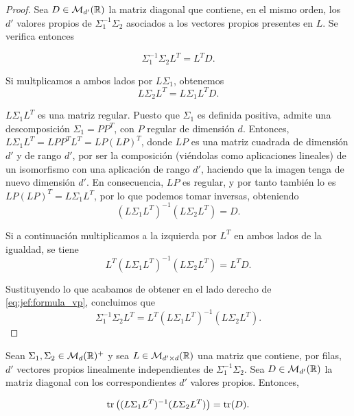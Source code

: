 \documentclass{book}
\begin{document}
\begin{proof} \label{thm:dmlmj1}
	Sea $D \in \mathcal{M}_{d'}(\mathbb{R})$ la matriz diagonal que contiene, en el mismo orden, los $d'$ valores propios de $\Sigma_1^{-1}\Sigma_2$ asociados a los vectores propios presentes en $L$. Se verifica entonces
	
	\begin{equation}\label{eq:jef:formula_vp}
		\Sigma_1^{-1}\Sigma_2L^T = L^TD.
	\end{equation} 

	Si multplicamos a ambos lados por $L\Sigma_1$, obtenemos
	\[ L\Sigma_2L^T = L\Sigma_1L^TD. \]

	$L\Sigma_1L^T$ es una matriz regular. Puesto que $\Sigma_1$ es definida positiva, admite una descomposición $\Sigma_1 = PP^T$, con $P$ regular de dimensión $d$. Entonces, $L\Sigma_1L^T = LPP^TL^T = LP(LP)^T$, donde $LP$ es una matriz cuadrada de dimensión $d'$ y de rango $d'$, por ser la composición (viéndolas como aplicaciones lineales) de un isomorfismo con una aplicación de rango $d'$, haciendo que la imagen tenga de nuevo dimensión $d'$. En consecuencia, $LP$ es regular, y por tanto también lo es $LP(LP)^T = L\Sigma_1L^T$, por lo que podemos tomar inversas, obteniendo
	\begin{equation} \label{eq:jef:coro1_pre}
		(L\Sigma_1L^T)^{-1}(L\Sigma_2L^T) = D.
	\end{equation}

	Si a continuación multiplicamos a la izquierda por $L^T$ en ambos lados de la igualdad, se tiene
	\[ L^T(L\Sigma_1L^T)^{-1}(L\Sigma_2L^T) = L^TD. \]

	Sustituyendo lo que acabamos de obtener en el lado derecho de \ref{eq:jef:formula_vp}, concluimos que
	\[\Sigma_1^{-1}\Sigma_2L^T = L^T(L\Sigma_1L^T)^{-1}(L\Sigma_2L^T).\]

\end{proof}

\begin{cor} \label{cor:dmlmj1}
 	Sean $\Sigma_1, \Sigma_2 \in \mathcal{M}_d(\mathbb{R})^+$ y sea $L \in \mathcal{M}_{d'\times d}(\mathbb{R})$ una matriz que contiene, por filas, $d'$ vectores propios linealmente independientes de $\Sigma_1^{-1}\Sigma_2$. Sea $D \in \mathcal{M}_{d'}(\mathbb{R})$ la matriz diagonal con los correspondientes $d'$ valores propios. Entonces,

 	\[ \operatorname{tr}\left( (L\Sigma_1L^T)^{-1}(L\Sigma_2L^T) \right) = \operatorname{tr}(D). \]
\end{cor}
\end{document}
